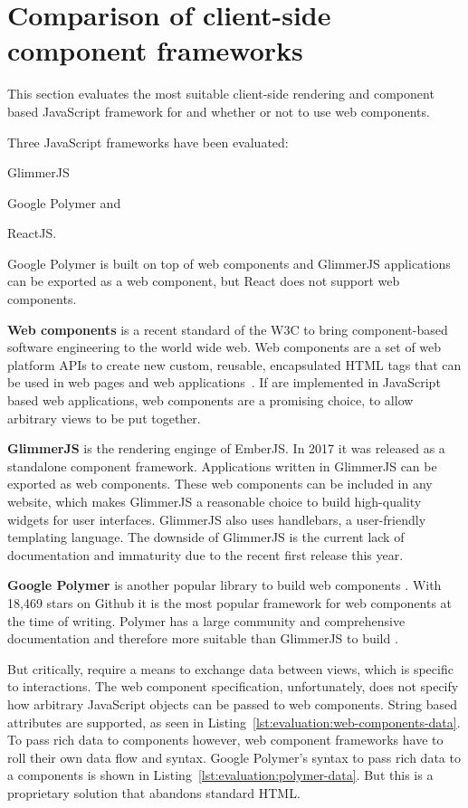 \section{Comparison of client-side component frameworks}

This section evaluates the most suitable client-side rendering and component based JavaScript framework for \cmvs{} and whether or not to use web components.

Three JavaScript frameworks have been evaluated:
\begin{enumerate*}[label=(\arabic*)]
  \item GlimmerJS
  \item Google Polymer and
  \item ReactJS.
\end{enumerate*}
Google Polymer is built on top of web components and GlimmerJS applications can be exported as a web component, but React does not support web components.

\textbf{Web components} is a recent standard of the W3C\cite{W3C2017} to bring component-based software engineering to the world wide web.
Web components are a set of web platform APIs to create new custom, reusable, encapsulated HTML tags that can be used in web pages and web applications~\cite{WebComponents2017}.
If \cmvs{} are implemented in JavaScript based web applications, web components are a promising choice, to allow arbitrary views to be put together.


\textbf{GlimmerJS} is the rendering enginge of EmberJS\cite{Ember2017}.
In 2017 it was released as a standalone component framework.
Applications written in GlimmerJS can be exported as web components.
These web components can be included in any website, which makes GlimmerJS a reasonable choice to build high-quality widgets for user interfaces.
GlimmerJS also uses handlebars\cite{Handlebars2017}, a user-friendly templating language.
The downside of GlimmerJS is the current lack of documentation and immaturity due to the recent first release this year.

\textbf{Google Polymer} is another popular library to build web components \cite{Polymer2017}.
With 18,469 stars on Github it is the most popular framework for web components at the time of writing.
Polymer has a large community and comprehensive documentation and therefore more suitable than GlimmerJS to build \cmvs{}.

But critically, \cmvs{} require a means to exchange data between views, which is specific to interactions.
The web component specification, unfortunately, does not specify how arbitrary JavaScript objects can be passed to web components.
String based attributes are supported, as seen in Listing~\ref{lst:evaluation:web-components-data}.
To pass rich data to components however, web component frameworks have to roll their own data flow and syntax.
Google Polymer's syntax to pass rich data to a components is shown in Listing~\ref{lst:evaluation:polymer-data}.
But this is a proprietary solution that abandons standard HTML.

